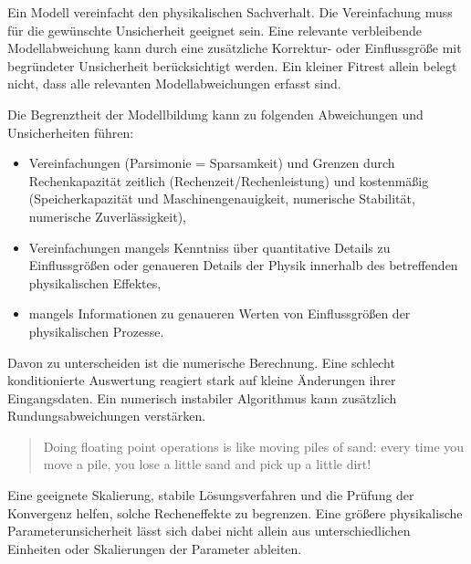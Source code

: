 Ein Modell vereinfacht den physikalischen Sachverhalt. Die Vereinfachung muss
für die gewünschte Unsicherheit geeignet sein. Eine relevante verbleibende
Modellabweichung kann durch eine zusätzliche Korrektur- oder Einflussgröße
mit begründeter Unsicherheit berücksichtigt werden. Ein kleiner Fitrest
allein belegt nicht, dass alle relevanten Modellabweichungen erfasst sind.

Die Begrenztheit der Modellbildung kann zu folgenden Abweichungen und Unsicherheiten führen:
\begin{itemize}
\item Vereinfachungen (Parsimonie = \glqq Sparsamkeit\grqq)
  und Grenzen durch Rechenkapazität zeitlich (Rechenzeit/Rechenleistung)
  und kostenmäßig (Speicherkapazität und Maschinengenauigkeit,
  numerische Stabilität, numerische Zuverlässigkeit),
\item Vereinfachungen mangels Kenntniss über quantitative Details
  zu Einflussgrößen
  oder genaueren Details der Physik innerhalb des
  betreffenden physikalischen Effektes,
\item mangels Informationen zu genaueren Werten von Einflussgrößen der
  physikalischen Prozesse.
\end{itemize}

Davon zu unterscheiden ist die numerische Berechnung. Eine schlecht
konditionierte Auswertung reagiert stark auf kleine Änderungen ihrer
Eingangsdaten. Ein numerisch instabiler Algorithmus kann zusätzlich
Rundungsabweichungen verstärken. 
\begin{quote}
Doing floating point operations is like moving piles of sand: every
time you move a pile, you lose a little sand and pick up a little dirt!
\end{quote}
Eine geeignete Skalierung, stabile
Lösungsverfahren und die Prüfung der Konvergenz helfen, solche Recheneffekte
zu begrenzen. Eine größere physikalische Parameterunsicherheit lässt sich
dabei nicht allein aus unterschiedlichen Einheiten oder Skalierungen der
Parameter ableiten.


